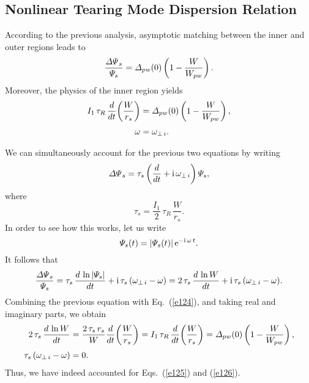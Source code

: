 \documentclass[12pt,prb,aps]{revtex4-1}
\begin{document}
\subsection{Nonlinear Tearing Mode Dispersion Relation}\label{enl}
According to the previous analysis, asymptotic matching between the
inner and outer regions leads to
\begin{equation}\label{e124}
\frac{{\mit\Delta\Psi}_s}{{\mit\Psi}_s} = {\mit\Delta}_{pw}(0)\left(1-\frac{W}{W_{pw}}\right).
\end{equation}
Moreover, the physics of the inner region yields
\begin{align}\label{e125}
I_1\,\tau_R\,\frac{d}{dt}\!\left(\frac{W}{r_s}\right)&= {\mit\Delta}_{pw}(0)\left(1-\frac{W}{W_{pw}}\right),\\[0.5ex]
\omega&=\omega_{\perp\,i}.\label{e126}
\end{align}

We can simultaneously account for the previous two equations by writing\,\cite{rf2021}
\begin{equation}\label{e127}
{\mit\Delta\Psi}_s = \tau_s\left(\frac{d}{dt}+{\rm i}\,\omega_{\perp\,i}\right){\mit\Psi}_s,
\end{equation}
where
\begin{equation}
\tau_s = \frac{I_1}{2}\,\tau_R\,\frac{W}{r_s}.
\end{equation}
In order to see how this works, let us write 
\begin{equation}\label{e128}
{\mit\Psi}_s(t)=|{\mit\Psi}_s(t)|\,{\rm e}^{-{\rm i}\,\omega\,t}.
\end{equation} 
It follows that
\begin{equation}
\frac{{\mit\Delta\Psi}_s}{{\mit\Psi}_s}= \tau_s\,\frac{d\,\ln|{\mit\Psi}_s|}{dt} + {\rm i}\,\tau_s\,(\omega_{\perp\,i}-\omega)= 
2\,\tau_s\,\frac{d\,\ln W}{dt} + {\rm i}\,\tau_s\,(\omega_{\perp\,i}-\omega).
\end{equation}
Combining the previous equation with Eq.~(\ref{e124}), and taking real and imaginary parts, we obtain
\begin{align}
2\,\tau_s\,\frac{d\,\ln W}{dt} &= \frac{2\,\tau_s\,r_s}{W}\frac{d}{dt}\!\left(\frac{W}{r_s}\right)= I_1\,\tau_R\,\frac{d}{dt}\!\left(\frac{W}{r_s}\right)= {\mit\Delta}_{pw}(0)\left(1-\frac{W}{W_{pw}}\right),\\[0.5ex]
\tau_s\,(\omega_{\perp\,i} -\omega) &= 0.
\end{align}
Thus, we have indeed accounted for Eqs.~(\ref{e125}) and (\ref{e126}). 
\end{document}

